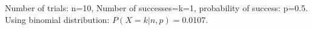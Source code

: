\documentclass{article}
\begin{document}
\begin{itemize}
{Number of trials: n=10, Number of successes=k=1,  probability of success: p=0.5. Using binomial distribution: $P(X=k|n,p)=$0.0107. }\vspace{\baselineskip} \vspace{\baselineskip} \vspace{\baselineskip}\end{itemize}
\newpage
\end{document}
